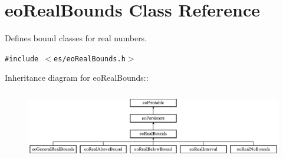 \section{eo\-Real\-Bounds Class Reference}
\label{classeo_real_bounds}
Defines bound classes for real numbers.  


{\tt \#include $<$es/eo\-Real\-Bounds.h$>$}

Inheritance diagram for eo\-Real\-Bounds::\begin{figure}[H]
\begin{center}
\leavevmode
\includegraphics[height=3.06849cm]{classeo_real_bounds}
\end{center}
\end{figure}
